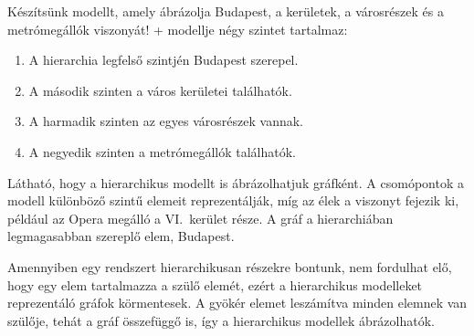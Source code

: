 
Készítsünk modellt, amely ábrázolja Budapest, a kerületek, a városrészek és a metrómegállók viszonyát! \Az+ modellje négy szintet tartalmaz:

\begin{enumerate}
	\item A hierarchia legfelső szintjén Budapest szerepel.
	\item A második szinten a város kerületei találhatók.
	\item A harmadik szinten az egyes városrészek vannak.
	\item A negyedik szinten a metrómegállók találhatók.
\end{enumerate}


Látható, hogy a hierarchikus modellt is ábrázolhatjuk gráfként. A csomópontok a modell különböző szintű elemeit reprezentálják, míg az élek a  viszonyt fejezik ki, például az Opera megálló a VI.~kerület része. A gráf  a hierarchiában legmagasabban szereplő elem, Budapest.

Amennyiben egy rendszert hierarchikusan részekre bontunk, nem fordulhat elő, hogy egy elem tartalmazza a szülő elemét, ezért a hierarchikus modelleket reprezentáló gráfok körmentesek. A gyökér elemet leszámítva minden elemnek van szülője, tehát a gráf összefüggő is, így a hierarchikus modellek  ábrázolhatók.

